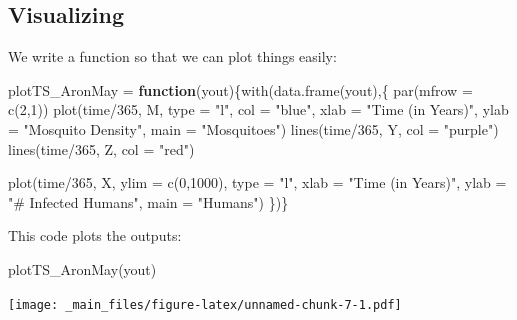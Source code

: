 \documentclass[
]{book}
\newenvironment{Shaded}{\begin{snugshade}}{\end{snugshade}}
\newcommand{\AttributeTok}[1]{\textcolor[rgb]{0.77,0.63,0.00}{#1}}
\newcommand{\ControlFlowTok}[1]{\textcolor[rgb]{0.13,0.29,0.53}{\textbf{#1}}}
\newcommand{\DecValTok}[1]{\textcolor[rgb]{0.00,0.00,0.81}{#1}}
\newcommand{\FunctionTok}[1]{\textcolor[rgb]{0.00,0.00,0.00}{#1}}
\newcommand{\NormalTok}[1]{#1}
\newcommand{\OtherTok}[1]{\textcolor[rgb]{0.56,0.35,0.01}{#1}}
\newcommand{\SpecialCharTok}[1]{\textcolor[rgb]{0.00,0.00,0.00}{#1}}
\newcommand{\StringTok}[1]{\textcolor[rgb]{0.31,0.60,0.02}{#1}}
\begin{document}
\hypertarget{visualizing}{%
\subsection{Visualizing}\label{visualizing}}

We write a function so that we can plot things easily:

\begin{Shaded}
\begin{Highlighting}[]
\NormalTok{plotTS\_AronMay }\OtherTok{=} \ControlFlowTok{function}\NormalTok{(yout)\{}\FunctionTok{with}\NormalTok{(}\FunctionTok{data.frame}\NormalTok{(yout),\{}
  \FunctionTok{par}\NormalTok{(}\AttributeTok{mfrow =} \FunctionTok{c}\NormalTok{(}\DecValTok{2}\NormalTok{,}\DecValTok{1}\NormalTok{))}
  \FunctionTok{plot}\NormalTok{(time}\SpecialCharTok{/}\DecValTok{365}\NormalTok{, M, }\AttributeTok{type =} \StringTok{"l"}\NormalTok{, }\AttributeTok{col =} \StringTok{"blue"}\NormalTok{, }
       \AttributeTok{xlab =} \StringTok{"Time (in Years)"}\NormalTok{, }
       \AttributeTok{ylab =} \StringTok{"Mosquito Density"}\NormalTok{, }
       \AttributeTok{main =} \StringTok{"Mosquitoes"}\NormalTok{)}
  \FunctionTok{lines}\NormalTok{(time}\SpecialCharTok{/}\DecValTok{365}\NormalTok{, Y, }\AttributeTok{col =} \StringTok{"purple"}\NormalTok{)}
  \FunctionTok{lines}\NormalTok{(time}\SpecialCharTok{/}\DecValTok{365}\NormalTok{, Z, }\AttributeTok{col =} \StringTok{"red"}\NormalTok{)}
  
  \FunctionTok{plot}\NormalTok{(time}\SpecialCharTok{/}\DecValTok{365}\NormalTok{, X, }\AttributeTok{ylim =} \FunctionTok{c}\NormalTok{(}\DecValTok{0}\NormalTok{,}\DecValTok{1000}\NormalTok{), }\AttributeTok{type =} \StringTok{"l"}\NormalTok{, }
       \AttributeTok{xlab =} \StringTok{"Time (in Years)"}\NormalTok{, }
       \AttributeTok{ylab =} \StringTok{"\# Infected Humans"}\NormalTok{, }
       \AttributeTok{main =} \StringTok{"Humans"}\NormalTok{)}
\NormalTok{\})\}}
\end{Highlighting}
\end{Shaded}

This code plots the outputs:

\begin{Shaded}
\begin{Highlighting}[]
\FunctionTok{plotTS\_AronMay}\NormalTok{(yout)}
\end{Highlighting}
\end{Shaded}

\texttt{[image: \_main\_files/figure-latex/unnamed-chunk-7-1.pdf]}
\end{document}
